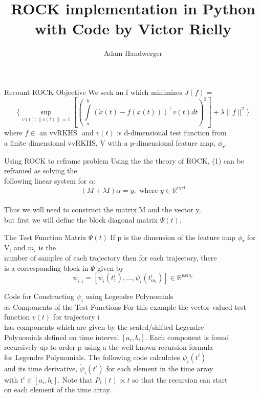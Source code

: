 \documentclass[12pt,aspectratio=2013]{beamer}
\title{ROCK implementation in Python\\
with Code by Victor Rielly}
\author{Adam Handwerger}
\date{}
\begin{document}
\frame{\titlepage}
\begin{frame}{Recount ROCK Objective}
    We seek an f which minimizes $J(f)=$\\
    \begin{equation}
    \biggl\{\sup\limits_{v(t):\parallel v(t) \parallel=1} \left[\left(\int\limits_a^b \left(\dot{x}(t)-f(x(t))\right)^{\top}v(t) dt \right)^2\right]+\lambda\! \parallel \!f\!\parallel^2\biggr\}
    \end{equation}
    \vspace{.25cm}
where $f \in$ an vvRKHS $\text{ and } v(t)$ is d-dimensional test function from\\
a finite dimensional vvRKHS, V with a p-dimensional feature map, $\phi_{\tau}$.\\ 
\end{frame}
\begin{frame}{Using ROCK to reframe problem}
Using the the theory of ROCK, (1) can be reframed as solving the\\
following linear system for $\alpha$:\\
\vspace{.5cm}
\begin{equation}
\left(M+\lambda I\right)\alpha=y, \text{ where } y\in{\mathbb{R}^{npd}}
\end{equation}
\\
\vspace{.25cm}
Thus we will need to construct the matrix M and the vector y,\\
but first we will define the block diagonal matrix $\Psi(t)$.\\
\end{frame}
\begin{frame}{The Test Function Matrix $\Psi(t)$}
If p is the dimension of the feature map $\phi_\tau$ for V, and $m_i$ is the\\
number of samples of each trajectory then for each trajectory, there\\
is a corresponding block in $\Psi$ given by\\
$$
\psi_{i,i}=[\psi_i(t^i_1),\dots,\psi_i(t^i_{m_{i}})] \in\mathbb{R}^{pxm_i}
$$
\end{frame}
\begin{frame}{Code for Constructing $\psi_i$ using Legendre Polynomials\\ as Components of the Test Functions}
For this example the vector-valued test function $v(t)$ for trajectory i\\ 
has components which are given by the scaled/shifted Legendre\\
Polynomials defined on time interval $[a_i,b_i]$. Each component is found \\
recursively up to order p using a the well known recursion formula\\
for Legendre Polynomials. The following code calculates $\psi_{i}(t^i)$\\
$\text{and its time derivative, } \dot{\psi}_{i}(t^i)$ for each element in the time array\\
with $t^i \in [a_i,b_i]$. Note that $P_1(t)\propto t$ so that the recursion can start\\
on each element of the time array.
\end{frame}
\end{document}
